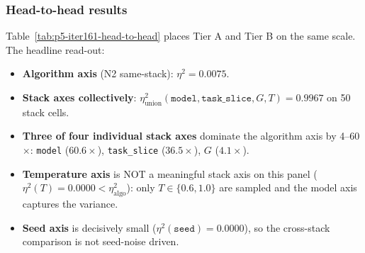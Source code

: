 \documentclass{article}  \usepackage[preprint,nonatbib]{neurips_2026} \usepackage[numbers]{natbib}
\begin{document}
\subsubsection{Head-to-head results}
\label{sec:p5-iter161-head-to-head}
Table~\ref{tab:p5-iter161-head-to-head} places Tier A and Tier B on
the same scale. The headline read-out:

\begin{itemize}
\item \textbf{Algorithm axis} (N2 same-stack): $\eta^2 = 0.0075$.
\item \textbf{Stack axes collectively}: $\eta^2_{\mathrm{union}}(\texttt{model},\texttt{task\_slice},G,T) = 0.9967$ on 50 stack cells.
\item \textbf{Three of four individual stack axes} dominate the algorithm axis by 4--60$\times$: \texttt{model} ($60.6\times$), \texttt{task\_slice} ($36.5\times$), $G$ ($4.1\times$).
\item \textbf{Temperature axis} is NOT a meaningful stack axis on this panel ($\eta^2(T) = 0.0000 < \eta^2_{\mathrm{algo}}$): only $T \in \{0.6, 1.0\}$ are sampled and the model axis captures the variance.
\item \textbf{Seed axis} is decisively small ($\eta^2(\texttt{seed}) = 0.0000$), so the cross-stack comparison is not seed-noise driven.
\end{itemize}
\end{document}

